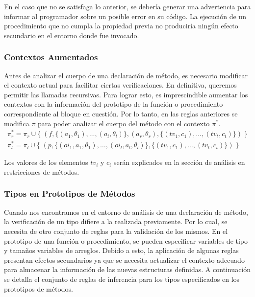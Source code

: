 \documentclass{article}
\begin{document}
En el caso que no se satisfaga lo anterior, se debería generar una advertencia para informar al programador sobre un posible error en su código.
La ejecución de un procedimiento que no cumpla la propiedad previa no produciría ningún efecto secundario en el entorno donde fue invocado.

\subsubsection{Contextos Aumentados}

Antes de analizar el cuerpo de una declaración de método, es necesario modificar el contexto actual para facilitar ciertas verificaciones.
En definitiva, queremos permitir las llamadas recursivas.
Para lograr esto, es imprescindible aumentar los contextos con la información del prototipo de la función o procedimiento correspondiente al bloque en cuestión.
Por lo tanto, en las reglas anteriores se modifica $\pi$ para poder analizar el cuerpo del método con el contexto $\pi^*$.
\begin{gather*}
\pi^*_r = \pi_r \cup
\{ \; (f, \{ (a_1, \theta_1), \ldots, (a_l, \theta_l) \}, (a_r, \theta_r), \{ (tv_1, c_1), \ldots, (tv_t, c_t) \}) \; \}
\\
\pi^*_l = \pi_l \cup
\{ \; (p, \{ (oi_1, a_1, \theta_1), \ldots, (oi_l, a_l, \theta_l) \}, \{ (tv_1, c_1), \ldots, (tv_t, c_t) \}) \; \}
\end{gather*}

Los valores de los elementos $tv_i$ y $c_i$ serán explicados en la sección de análisis en restricciones de métodos. 

\subsubsection{Tipos en Prototipos de Métodos}

Cuando nos encontramos en el entorno de análisis de una declaración de método, la verificación de un tipo difiere a la realizada previamente.
Por lo cual, se necesita de otro conjunto de reglas para la validación de los mismos.
En el prototipo de una función o procedimiento, se pueden especificar variables de tipo y tamaños variables de arreglos.
Debido a esto, la aplicación de algunas reglas presentan efectos secundarios ya que se necesita actualizar el contexto adecuado para almacenar la información de las nuevas estructuras definidas.
A continuación se detalla el conjunto de reglas de inferencia para los tipos especificados en los prototipos de métodos.
\end{document}
